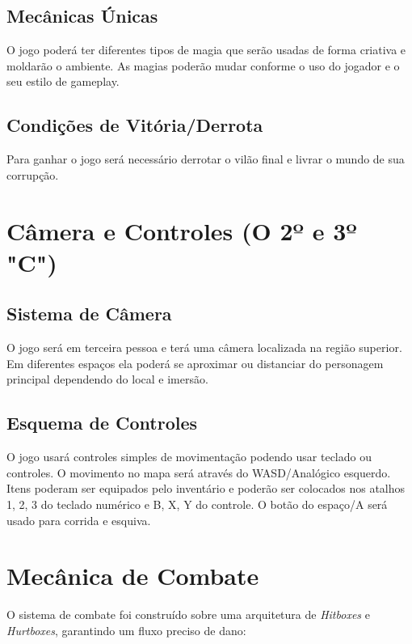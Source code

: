 \documentclass[12pt, a4paper]{article} %
\begin{document}
	\subsection{Mecânicas Únicas}
	
	O jogo poderá ter diferentes tipos de magia que serão usadas de forma criativa e moldarão o ambiente.
	As magias poderão mudar conforme o uso do jogador e o seu estilo de gameplay.
	
	\subsection{Condições de Vitória/Derrota}
	
	Para ganhar o jogo será necessário derrotar o vilão final e livrar o mundo de sua corrupção.
	
	\newpage
	
	
	\section{Câmera e Controles (O 2º e 3º "C")}
	
	\subsection{Sistema de Câmera}
	
	O jogo será em terceira pessoa e terá uma câmera localizada na região superior. Em diferentes espaços ela poderá se aproximar ou distanciar do personagem principal dependendo do local e imersão.
	
	\subsection{Esquema de Controles}
	
	O jogo usará controles simples de movimentação podendo usar teclado ou controles.
	O movimento no mapa será através do WASD/Analógico esquerdo. Itens poderam ser equipados pelo inventário e poderão ser colocados nos atalhos 1, 2, 3 do teclado numérico e B, X, Y do controle.  
	O botão do espaço/A será usado para corrida e esquiva.
	
	\newpage
	
	
	\section{Mecânica de Combate}
	O sistema de combate foi construído sobre uma arquitetura de \textit{Hitboxes} e \textit{Hurtboxes}, garantindo um fluxo preciso de dano:
	
\end{document}
